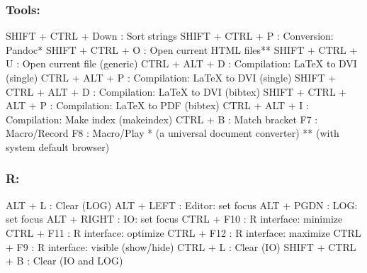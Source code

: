 \newpage
\subsubsection{Tools:}

\vspace{-0.5cm}
\begin{Rtables}[caption={[Tools menu keyboard shortcuts]
    ToolsMenu keyboard shortcuts},
  label=menu:tools]
  SHIFT + CTRL + Down     : Sort strings
  SHIFT + CTRL + P        : Conversion: Pandoc*
  SHIFT + CTRL + O        : Open current HTML files**
  SHIFT + CTRL + U        : Open current file (generic)
  CTRL  + ALT  + D        : Compilation: LaTeX to DVI (single)
  CTRL  + ALT  + P        : Compilation: LaTeX to DVI (single)
  SHIFT + CTRL + ALT + D  : Compilation: LaTeX to DVI (bibtex)
  SHIFT + CTRL + ALT + P  : Compilation: LaTeX to PDF (bibtex)
  CTRL  + ALT  + I        : Compilation: Make index (makeindex)
  CTRL  + B               : Match bracket
  F7                      : Macro/Record
  F8                      : Macro/Play
  *  (a universal document converter)
  ** (with system default browser)
\end{Rtables}


\subsubsection{R:}

\vspace{-0.5cm}
\begin{Rtables}[caption={[R menu keyboard shortcuts]
    R menu keyboard shortcuts},
  label=menu:r]
  ALT  + L               : Clear (LOG)
  ALT  + LEFT            : Editor: set focus
  ALT  + PGDN            : LOG: set focus
  ALT  + RIGHT           : IO: set focus
  CTRL + F10             : R interface: minimize
  CTRL + F11             : R interface: optimize
  CTRL + F12             : R interface: maximize
  CTRL + F9              : R interface: visible (show/hide)
  CTRL + L               : Clear (IO)
  SHIFT + CTRL + B       : Clear (IO and LOG)
\end{Rtables}


\newpage
